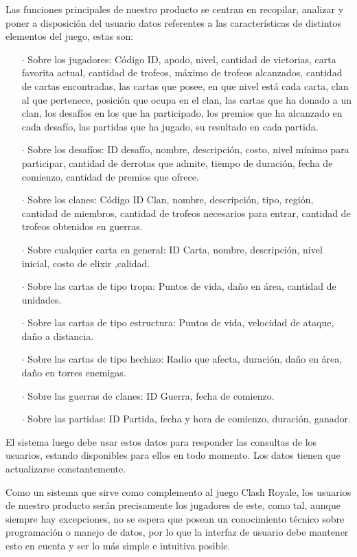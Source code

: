 Las funciones principales de nuestro producto se centran en recopilar, analizar y poner a disposición del usuario datos referentes a las características de distintos elementos del juego, estas son:

\begin{enumerate}
  \item[\(\cdot\)] Sobre los jugadores: Código ID, apodo, nivel, cantidad de victorias, carta favorita actual, cantidad de trofeos, máximo de trofeos alcanzados, cantidad de cartas encontradas, las cartas que posee, en que nivel está cada carta, clan al que pertenece, posición que ocupa en el clan, las cartas que ha donado a un clan, los desafíos en los que ha participado, los premios que ha alcanzado en cada desafío, las partidas que ha jugado, su resultado en cada partida.
  \item[\(\cdot\)] Sobre los desafíos: ID desafío, nombre, descripción, costo, nivel mínimo para participar, cantidad de derrotas que admite, tiempo de duración, fecha de comienzo, cantidad de premios que ofrece.
  \item[\(\cdot\)] Sobre los clanes: Código ID Clan, nombre, descripción, tipo, región, cantidad de miembros, cantidad de trofeos necesarios para entrar, cantidad de trofeos obtenidos en guerras.
  \item[\(\cdot\)] Sobre cualquier carta en general: ID Carta, nombre, descripción, nivel inicial, costo de elixir ,calidad.
  \item[\(\cdot\)] Sobre las cartas de tipo tropa: Puntos de vida, daño en área, cantidad de unidades.
  \item[\(\cdot\)] Sobre las cartas de tipo estructura: Puntos de vida, velocidad de ataque, daño a distancia.
  \item[\(\cdot\)] Sobre las cartas de tipo hechizo: Radio que afecta, duración, daño en área, daño en torres enemigas.
  \item[\(\cdot\)] Sobre las guerras de clanes: ID Guerra, fecha de comienzo.
  \item[\(\cdot\)] Sobre las partidas: ID Partida, fecha y hora de comienzo, duración, ganador.
\end{enumerate}

El sistema luego debe usar estos datos para responder las consultas de los usuarios, estando disponibles para ellos en todo momento. Los datos tienen que actualizarse constantemente. 

Como un sistema que sirve como complemento al juego Clash Royale, los usuarios de nuestro producto serán precisamente los jugadores de este, como tal, aunque siempre hay excepciones, no se espera que posean un conocimiento técnico sobre programación o manejo de datos, por lo que la interfaz de usuario debe mantener esto en cuenta y ser lo más simple e intuitiva posible. 

